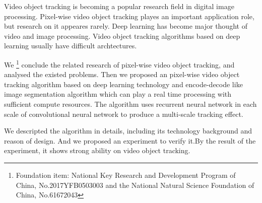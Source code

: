\begin{eabstract}
	Video object tracking is becoming a popular research field in digital image processing. Pixel-wise video object tracking playes an important application role, but research on it appeares rarely. Deep learning has become major thought of video and image processing. Video object tracking algorithms based on deep learning usually have difficult archtectures.
	\par
	We \footnote{Foundation item: National Key Research and Development Program of China, No.2017YFB0503003 and the National Natural Science Foundation of China, No.61672043} conclude the related research of pixel-wise video object tracking, and analysed the existed problems. Then we proposed an pixel-wise video object tracking algorithm based on deep learning technology and encode-decode like image segmentation algorithm which can play a real time processing with sufficient compute resources. The algorithm uses recurrent neural network in each scale of convolutional neural network to produce a multi-scale tracking effect.
	\par
	We descripted the algorithm in details, including its technology background and reason of design. And we proposed an experiment to verify it.By the result of the experiment, it shows strong ability on video object tracking.
\end{eabstract}

